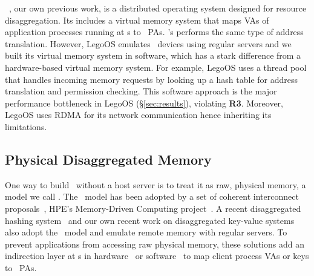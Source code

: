~\cite{Shan18-OSDI}, our own previous work, is a distributed operating system designed for resource disaggregation.
Its \MN{} includes a virtual memory system that maps VAs of application processes running at \CN{}s to \MN\ PAs. \sys's \MN{} performs the same type of address translation.
However, LegoOS emulates \MN\ devices using regular servers and we built its virtual memory system in software,
which has a stark difference from a hardware-based virtual memory system. 
For example, LegoOS uses a thread pool that handles incoming memory requests by looking up a hash table for address translation and permission checking.
This software approach is the major performance bottleneck in LegoOS (\S\ref{sec:results}),
violating \textbf{R3}.
Moreover, LegoOS %
uses RDMA for its network communication hence inheriting its limitations.

\subsection{Physical Disaggregated Memory}
\label{sec:pdm}

One way to build \md\ without a host server is to treat it as raw, physical memory,
a model we call {\em \pdm}.
The \pdm\ model has been adopted by a set of coherent interconnect proposals~\cite{Genz-citation,CXL-citation},
HPE's Memory-Driven Computing project~\cite{HP-TheMachine,THEMACHINE-HOTOS,HP-MODC-POSTER,THEMACHINE-WEB}.
A recent disaggregated hashing system~\cite{race-atc21} and our own recent work on disaggregated key-value systems~\cite{Tsai20-ATC} also adopt the \pdm\ model and emulate remote memory with regular servers.
To prevent applications from accessing raw physical memory,
these solutions add an indirection layer at \CN{}s in hardware~\cite{Genz-citation,CXL-citation} or software~\cite{Tsai20-ATC,race-atc21}
to map client process VAs or keys
to \MN\ PAs. 

